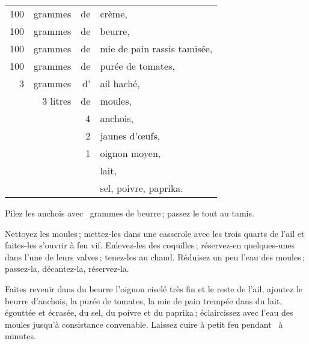 \footnotesize
\begin{longtable}{rrrp{16em}}
    100 & grammes  & de & crème,                                                                          \\
    100 & grammes  & de & beurre,                                                                         \\
    100 & grammes  & de & mie de pain rassis tamisée,                                                     \\
    100 & grammes  & de & purée de tomates,                                                               \\
      3 & grammes  & d' & ail haché,                                                                      \\
        & 3 litres & de & moules,                                                                         \\
        &          & 4  & anchois,                                                                        \\
        &          & 2  & jaunes d'œufs,                                                                  \\
        &          & 1  & oignon moyen,                                                                   \\
        &          &    & lait,                                                                           \\
        &          &    & sel, poivre, paprika.                                                           \\
\end{longtable}
\normalsize

Pilez les anchois avec {\mmm} grammes de beurre ; passez le tout au tamis.

Nettoyez les moules ; mettez-les dans une casserole avec les trois quarts de
l'ail et faites-les s'ouvrir à feu vif. Enlevez-les des coquilles ; réservez-en
quelques-unes dans l’une de leurs valves ; tenez-les au chaud. Réduisez un peu
l'eau des moules ; passez-la, décantez-la, réservez-la.

Faites revenir dans du beurre l'oignon ciselé très fin et le reste de l'ail,
ajoutez le beurre d’anchois, la purée de tomates, la mie de pain trempée dans
du lait, égouttée et écrasée, du sel, du poivre et du paprika ; éclaircissez
avec l'eau des moules jusqu'à consistance convenable. Laissez cuire à petit feu
pendant {\mmm} à {\mmm} minutes.


